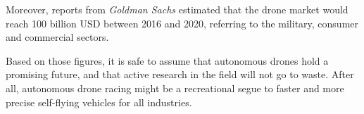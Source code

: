 Moreover, reports from \emph{Goldman Sachs} \cite{TopTal} estimated that the
drone market would reach 100 billion USD between 2016 and 2020, referring to the
military, consumer and commercial sectors.%


Based on those figures, it is safe to assume that autonomous drones hold a
promising future, and that active research in the field will not go to waste.
After all, autonomous drone racing might be a recreational segue to faster and
more precise self-flying vehicles for all industries.
